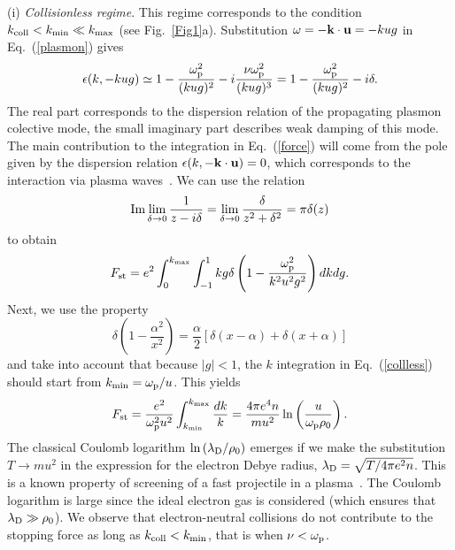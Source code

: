 \documentclass[twocolumn, 
  aps, prl,
  amsmath,amssymb,
  ]{revtex4-1}
\begin{document}
(i) {\it Collisionless regime}. This regime corresponds to the condition $k_{\rm coll}<k_{\rm min}\ll k_{\rm max}$ (see Fig.~\ref{Fig1}a). Substitution $\omega=-{\bf k}\cdot {\bf u}=-kug$ in Eq.~(\ref{plasmon}) gives
\begin{displaymath}
\epsilon(k,-kug)\simeq 1-\frac{\omega_{\rm p}^2}{(kug)^2}-i\frac{\nu \omega_{\rm p}^2}{(kug)^3} = 1-\frac{\omega_{\rm p}^2}{(kug)^2}-i\delta.
\end{displaymath} 
The real part corresponds to the dispersion relation of the propagating plasmon colective mode, the small imaginary part describes weak damping of this mode. The main contribution to the integration in Eq.~(\ref{force}) will come from the pole given by the dispersion relation $\epsilon(k,-{\bf k}\cdot {\bf u})=0$, which corresponds to the interaction via plasma waves~\cite{LL}. We can use the relation
\begin{displaymath}
{\rm Im}\lim_{\delta\rightarrow 0}\frac{1}{z-i\delta}=\lim_{\delta\rightarrow 0}\frac{\delta}{z^2+\delta^2}=\pi \delta(z)
\end{displaymath}   
to obtain
\begin{equation}\label{collless}
F_{\rm st}={e^2}\int_0^{k_{\max}}\int_{-1}^{1}kg \delta\left(1-\frac{\omega_{\rm p}^2}{k^2u^2g^2}\right)dkdg.
\end{equation}
Next, we use the property
\begin{displaymath}
\delta\left(1-\frac{\alpha^2}{x^2}\right)=\frac{\alpha}{2}\left[\delta(x-\alpha)+\delta(x+\alpha)\right]
\end{displaymath} 
and take into account that because $|g|<1$, the $k$ integration in Eq.~(\ref{collless}) should start from $k_{\min}=\omega_{\rm p}/u$. This yields
\begin{equation}\label{collless1}
F_{\rm st}=\frac{e^2}{\omega_{\rm p}^2 u^2}\int_{k_{\min}}^{k_{\max}}\frac{dk}{k}=\frac{4\pi e^4 n}{mu^2}\ln\left(\frac{u}{\omega_{\rm p}\rho_0 }\right).
\end{equation} 
The classical Coulomb logarithm $\ln\left(\lambda_{\rm D}/\rho_0\right)$ emerges if we make the substitution $T\rightarrow mu^2$ in the expression for the electron Debye radius, $\lambda_{\rm D}=\sqrt{T/4\pi e^2 n}$. This is a known property of screening of a fast projectile in a plasma~\cite{KhrapakPoP2005,LudwigNJP2012}. The Coulomb logarithm is large since the ideal electron gas is considered (which ensures that $\lambda_{\rm D}\gg\rho_0$). We observe that electron-neutral collisions do not contribute to the stopping force as long as $k_{\rm coll}<k_{\rm min}$, that is when $\nu<\omega_{\rm p}$.  
\end{document}
